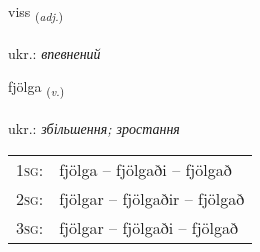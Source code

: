 \documentclass[frontgrid, backgrid]{flacards}\usepackage[]{graphicx}\usepackage[]{xcolor}
\begin{document}
\renewcommand{\flhead}{\vskip5pt \fboxsep=0pt {\small\bfseries\footnotesize Lýsingarorð | прикметник}}
\renewcommand{\fcfoot}{\vskip5pt \fboxsep=0pt \hspace{2pt}{\small\bfseries\footnotesize 1K}}

\renewcommand{\blhead}{\vskip5pt {\small\bfseries\footnotesize Lýsingarorð | прикметник }}
\renewcommand{\bcfoot}{\vskip5pt \hspace{2pt}{\small\bfseries\footnotesize 1K}}


{viss \small{\textsubscript{(\textit{adj.})}} \\[1ex] %
\textphonetic{[vɪs]} \\
ukr.: \emph{впевнений} \\  [2ex]
\renewcommand*{\arraystretch}{0.8}
}

\renewcommand{\flhead}{\vskip5pt \fboxsep=0pt {\small\bfseries\footnotesize Sagnorð | дієслово}}
\renewcommand{\fcfoot}{\vskip5pt \fboxsep=0pt \hspace{2pt}{\small\bfseries\footnotesize 1K}}

\renewcommand{\blhead}{\vskip5pt {\small\bfseries\footnotesize Sagnorð | дієслово }}
\renewcommand{\bcfoot}{\vskip5pt \hspace{2pt}{\small\bfseries\footnotesize 1K}}


{fjölga \small{\textsubscript{(\textit{v.})}} \\[1ex] %
\textphonetic{[fjœlka]} \\
ukr.: \emph{збільшення; зростання} \\  [2ex]
\renewcommand*{\arraystretch}{0.8}
\begin{tabular}{p{1cm}l}
\textsc{1sg}: & fjölga -- fjölgaði -- fjölgað \\ 
\textsc{2sg}: & fjölgar -- fjölgaðir -- fjölgað \\ 
\textsc{3sg}: & fjölgar -- fjölgaði -- fjölgað \\ 
\end{tabular}
}
\end{document}
